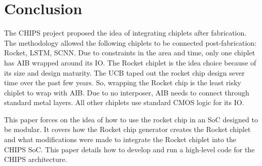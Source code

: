 \documentclass[../main.tex]{subfiles}
\begin{document}
\section{Conclusion}
The CHIPS project proposed the idea of integrating chiplets after fabrication. The methodology allowed the following chiplets to be connected post-fabrication: Rocket, LSTM, SCNN. Due to constraints in the area and time, only one chiplet has AIB wrapped around its IO. The Rocket chiplet is the idea choice because of its size and design maturity. The UCB taped out the rocket chip design sever time over the past few years\cite{Asanović:EECS-2016-17}. So, wrapping the Rocket chip is the least risky chiplet to wrap with AIB. Due to no interposer, AIB needs to connect through standard metal layers. All other chiplets use standard CMOS logic for its IO.

This paper forces on the idea of how to use the rocket chip in an SoC designed to be modular. It covers how the Rocket chip generator creates the Rocket chiplet and what modifications were made to integrate the Rocket chiplet into the CHIPS SoC. This paper details how to develop and run a high-level code for the CHIPS architecture. 
\end{document}
